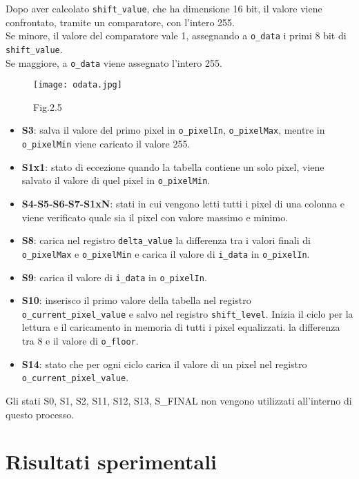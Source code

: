 \documentclass[12pt, table, xcdraw]{article}
\begin{document}
Dopo aver calcolato \texttt{shift\_value}, che ha dimensione 16 bit, il valore viene confrontato, tramite un comparatore, con l'intero 255. \\
Se minore, il valore del comparatore vale 1, assegnando a \texttt{o\_data} i primi 8 bit di \texttt{shift\_value}.\\
Se maggiore, a \texttt{o\_data} viene assegnato l'intero 255. \\

\begin{figure}[h!]
\begin{center}
  \texttt{[image: odata.jpg]}
  \caption*{Fig.2.5}
\end{center}
\end{figure}
\FloatBarrier

\begin{itemize}
\item \textbf{S3}: salva il valore del primo pixel in \texttt{o\_pixelIn}, \texttt{o\_pixelMax}, mentre in \texttt{o\_pixelMin} viene caricato il valore 255.
\item \textbf{S1x1}: stato di eccezione quando la tabella contiene un solo pixel, viene salvato il valore di quel pixel in \texttt{o\_pixelMin}.
\item \textbf{S4-S5-S6-S7-S1xN}: stati in cui vengono letti tutti i pixel di una colonna e viene verificato quale sia il pixel con valore massimo e minimo.
\item \textbf{S8}: carica nel registro \texttt{delta\_value} la differenza tra i valori finali di \texttt{o\_pixelMax} e \texttt{o\_pixelMin} e carica il valore di \texttt{i\_data} in \texttt{o\_pixelIn}.
\item \textbf{S9}: carica il valore di \texttt{i\_data} in \texttt{o\_pixelIn}.
\item \textbf{S10}: inserisco il primo valore della tabella nel registro \texttt{o\_current\_pixel\_value} e salvo nel registro \texttt{shift\_level}. Inizia il ciclo per la lettura e il caricamento in memoria di tutti i pixel equalizzati.
la differenza tra 8 e il valore di \texttt{o\_floor}.
\item \textbf{S14}: stato che per ogni ciclo carica il valore di un pixel nel registro \texttt{o\_current\_pixel\_value}.
\end{itemize}
Gli stati S0, S1, S2, S11, S12, S13, S\_FINAL non vengono utilizzati all'interno di questo processo.
\newpage


\section{Risultati sperimentali}
\end{document}
